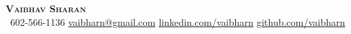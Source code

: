 \begin{center}
    \textbf{\Huge \scshape Vaibhav Sharan} \\ \vspace{1pt}
     \ \small 602-566-1136 \quad
    \href{mailto:vaibharn@gmail.com}{ {vaibharn@gmail.com}} \quad
    \href{https://www.linkedin.com/in/vaibharn}{ {linkedin.com/vaibharn}} \quad
    \href{https://www.github.com/vaibharn}{ {github.com/vaibharn}} \quad
\end{center}